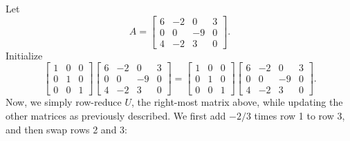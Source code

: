 \documentclass[draft,12pt]{report}
\begin{document}
Let
\[ A = \begin{bmatrix}
    6 & -2 & 0 & 3 \\
    0 & 0 & -9 & 0 \\
    4 & -2 & 3 & 0
\end{bmatrix}. \]
Initialize
\[ \begin{bmatrix}
    1 & 0 & 0 \\
    0 & 1 & 0 \\
    0 & 0 & 1
\end{bmatrix} \begin{bmatrix}
    6 & -2 & 0 & 3 \\
    0 & 0 & -9 & 0 \\
    4 & -2 & 3 & 0
\end{bmatrix} = \begin{bmatrix}
    1 & 0 & 0 \\
    0 & 1 & 0 \\
    0 & 0 & 1
\end{bmatrix} \begin{bmatrix}
    6 & -2 & 0 & 3 \\
    0 & 0 & -9 & 0 \\
    4 & -2 & 3 & 0
\end{bmatrix}. \]
Now, we simply row-reduce $U$, the right-most matrix above, while updating the other matrices as previously described. We first add $-2/3$ times row 1 to row 3, and then swap rows 2 and 3:
\end{document}
